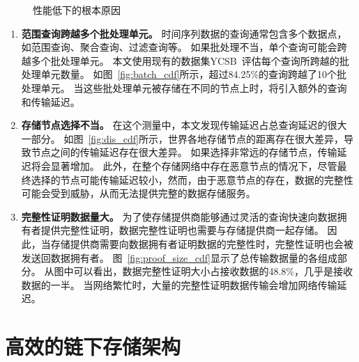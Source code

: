 \begin{figure*}[t]
    \centering
    \begin{minipage}{1\linewidth}
	    \centering
        \hfill
        \hfill
        \caption{性能低下的根本原因} 
    \end{minipage}
\end{figure*}

\begin{enumerate}
    \item \textbf{范围查询跨越多个批处理单元。}
    时间序列数据的查询通常包含多个数据点，如范围查询、聚合查询、过滤查询等。
    如果批处理不当，单个查询可能会跨越多个批处理单元。
    本文使用现有的数据集YCSB~\cite{barata2014ycsb}评估每个查询所跨越的批处理单元数量。
    如图~\autoref{fig:batch_cdf}所示，超过84.25\%的查询跨越了10个批处理单元。
    当这些批处理单元被存储在不同的节点上时，将引入额外的查询和传输延迟。

    \item \textbf{存储节点选择不当。}
    在这个测量中，本文发现传输延迟占总查询延迟的很大一部分。
    如图~\autoref{fig:dis_cdf}所示，世界各地存储节点的距离存在很大差异，导致节点之间的传输延迟存在很大差异。
    如果选择非常远的存储节点，传输延迟将会显著增加。
    此外，在整个存储网络中存在恶意节点的情况下，尽管最终选择的节点可能传输延迟较小，然而，由于恶意节点的存在，数据的完整性可能会受到威胁，从而无法提供完整的数据存储服务。

    \item \textbf{完整性证明数据量大。}
    为了使存储提供商能够通过灵活的查询快速向数据拥有者提供完整性证明，数据完整性证明也需要与存储提供商一起存储。
    因此，当存储提供商需要向数据拥有者证明数据的完整性时，完整性证明也会被发送回数据拥有者。
    图~\autoref{fig:proof_size_cdf}显示了总传输数据量的各组成部分。
    从图中可以看出，数据完整性证明大小占接收数据的48.8\%，几乎是接收数据的一半。
    当网络繁忙时，大量的完整性证明数据传输会增加网络传输延迟。
\end{enumerate}

\section{高效的链下存储架构}
\label{sec:design}

